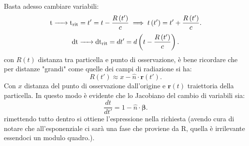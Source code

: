 Basta adesso cambiare variabili: 
\[
	\ce{\ce{t} -> \ce{t_{\text{rit}}}} = t' =  t - \frac{R\left( t' \right) }{c} \implies t\left( t' \right) = t' + \frac{R\left( t' \right) }{c}  
.\] 
\[
	\ce{\ce{dt} -> \ce{dt_{\text{rit}}}} = dt' = d \left(t - \frac{R\left( t' \right) }{c} \right)
.\] 
con $R\left( t \right)$ distanza tra particella e punto di osservazione, è bene ricordare che per distanze "grandi" come quelle dei campi di radiazione si ha:
\[
	R\left( t' \right) \approx x - \hat{n}\cdot \boldsymbol{r}\left( t' \right)  
.\] 
Con $x$ distanza del punto di osservazione dall'origine e $\boldsymbol{r}\left( t \right)$ traiettoria della particella. In questo modo è evidente che lo Jacobiano del cambio di variabili sia:
\[
	\frac{dt}{dt'}= 1-\hat{n} \cdot \boldsymbol{\beta}
.\] 
rimettendo tutto dentro si ottiene l'espressione nella richiesta (avendo cura di notare che all'esponenziale ci sarà una fase che proviene da R, quella è irrilevante essendoci un modulo quadro.).


